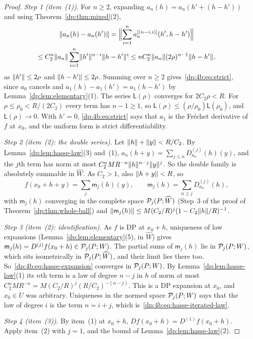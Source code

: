 \begin{proof}
\emph{Step 1 (item~(1)).} For $n\ge2$, expanding $a_n(h)=a_n(h'+(h-h'))$ and using Theorem~\ref{dp:thm:mixed}(2),
\begin{multline*}
 \lVert a_n(h)-a_n(h')\rVert=\Bigl\lVert\sum_{i=1}^na_n^{[(n-i,i)]}(h',h-h')\Bigr\rVert\\
 \le C_2^n\lVert a_n\rVert\sum_{i=1}^n\lVert h'\rVert^{n-i}\lVert h-h'\rVert^i\le nC_2^n\lVert a_n\rVert(2\rho)^{n-1}\lVert h-h'\rVert,
\end{multline*}
as $\lVert h'\rVert\le2\rho$ and $\lVert h-h'\rVert\le2\rho$. Summing over $n\ge2$ gives~\eqref{dp:4b:eq:strict}, since $a_0$ cancels and $a_1(h)-a_1(h')=a_1(h-h')$ by Lemma~\ref{dp:lem:elementary}(1). The series $\mathsf L(\rho)$ converges for $2C_2\rho<R$. For $\rho\le\rho_0<R/(2C_2)$ every term has $n-1\ge1$, so $\mathsf L(\rho)\le(\rho/\rho_0)\mathsf L(\rho_0)$, and $\mathsf L(\rho)\to0$. With $h'=0$, \eqref{dp:4b:eq:strict} says that $a_1$ is the Fr\'echet derivative of $f$ at $x_0$, and the uniform form is strict differentiability.

\emph{Step 2 (item~(2): the double series).} Let $\lVert h\rVert+\lVert y\rVert<R/C_2$. By Lemma~\ref{dp:lem:hasse-law}(3) and~(1), $a_n(h+y)=\sum_{j\le n}D^{(j)}_{a_n}(h)(y)$, and the $j$th term has norm at most $C_2^nMR^{-n}\lVert h\rVert^{n-j}\lVert y\rVert^j$. So the double family is absolutely summable in $\widehat W$. As $C_2>1$, also $\lVert h+y\rVert<R$, so
\[
 f(x_0+h+y)=\sum_j\mathsf m_j(h)(y),\qquad \mathsf m_j(h)=\sum_{n\ge j}D^{(j)}_{a_n}(h),
\]
with $\mathsf m_j(h)$ converging in the complete space $\mathcal P_j(P;\widehat W)$ (Step~3 of the proof of Theorem~\ref{dp:thm:whole-ball}) and $\lVert \mathsf m_j(h)\rVert\le M(C_2/R)^j(1-C_2\lVert h\rVert/R)^{-1}$.

\emph{Step 3 (item~(2): identification).} As $f$ is DP at $x_0+h$, uniqueness of law expansions (Lemma~\ref{dp:lem:elementary}(5), in $\widehat W$) gives $\mathsf m_j(h)=D^{(j)}f(x_0+h)\in\mathcal P_j(P;W)$. The partial sums of $\mathsf m_j(h)$ lie in $\mathcal P_j(P;W)$, which sits isometrically in $\mathcal P_j(P;\widehat W)$, and their limit lies there too. So~\eqref{dp:4b:eq:hasse-expansion} converges in $\mathcal P_j(P;W)$. By Lemma~\ref{dp:lem:hasse-law}(1) its $n$th term is a law of degree $n-j$ in $h$ of norm at most $C_2^nMR^{-n}=M(C_2/R)^j(R/C_2)^{-(n-j)}$. This is a DP expansion at $x_0$, and $x_0\in U$ was arbitrary. Uniqueness in the normed space $\mathcal P_j(P;W)$ says that the law of degree $i$ is the term $n=i+j$, which is~\eqref{dp:4b:eq:hasse-iterated-law}.

\emph{Step 4 (item~(3)).} By item~(1) at $x_0+h$, $Df(x_0+h)=D^{(1)}f(x_0+h)$. Apply item~(2) with $j=1$, and the bound of Lemma~\ref{dp:lem:hasse-law}(2).


\end{proof}
